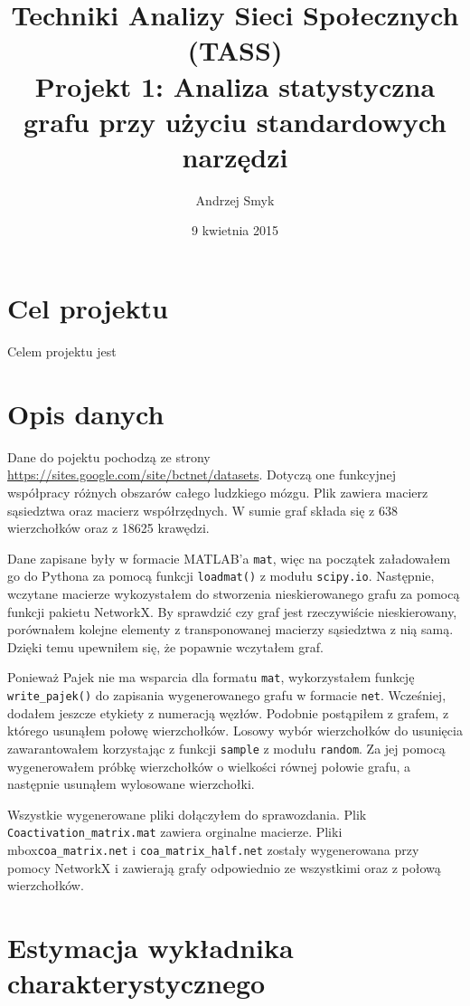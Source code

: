 \documentclass[a4paper,10pt]{article}
\title{Techniki Analizy Sieci Społecznych (TASS)\\Projekt 1: Analiza statystyczna grafu przy użyciu standardowych narzędzi}
\author{Andrzej Smyk}
\date{9 kwietnia 2015}
\begin{document}
	\maketitle
	
	\section{Cel projektu}
	Celem projektu jest 

	\section{Opis danych}
	Dane do pojektu pochodzą ze strony \linebreak\url{https://sites.google.com/site/bctnet/datasets}. Dotyczą one funkcyjnej współpracy różnych obszarów całego ludzkiego mózgu. Plik zawiera macierz sąsiedztwa oraz macierz współrzędnych. W sumie graf składa się z 638 wierzchołków oraz z 18625 krawędzi. 

	Dane zapisane były w formacie MATLAB'a \texttt{mat}, więc na początek załadowałem go do Pythona za pomocą funkcji \texttt{loadmat()} z modułu \texttt{scipy.io}. Następnie, wczytane macierze wykozystałem do stworzenia nieskierowanego grafu za pomocą funkcji pakietu NetworkX. By sprawdzić czy graf jest rzeczywiście nieskierowany, porównałem kolejne elementy z transponowanej macierzy sąsiedztwa z nią samą. Dzięki temu upewniłem się, że popawnie wczytałem graf.

	Ponieważ Pajek nie ma wsparcia dla formatu \texttt{mat}, wykorzystałem funkcję \texttt{write\_pajek()} do zapisania wygenerowanego grafu w formacie \texttt{net}. Wcześniej, dodałem jeszcze etykiety z numeracją węzłów. Podobnie postąpiłem z grafem, z którego usunąłem połowę wierzchołków. Losowy wybór wierzchołków do usunięcia zawarantowałem korzystając z funkcji \texttt{sample} z modułu \texttt{random}. Za jej pomocą wygenerowałem próbkę wierzchołków o wielkości równej połowie grafu, a następnie usunąłem wylosowane wierzchołki.

	Wszystkie wygenerowane pliki dołączyłem do sprawozdania. Plik \linebreak\texttt{Coactivation\_matrix.mat} zawiera orginalne macierze. Pliki mbox{\texttt{coa\_matrix.net}} i \mbox{\texttt{coa\_matrix\_half.net}} zostały wygenerowana przy pomocy NetworkX i zawierają grafy odpowiednio ze wszystkimi oraz z połową wierzchołków.

	\section{Estymacja wykładnika charakterystycznego}
\end{document}
